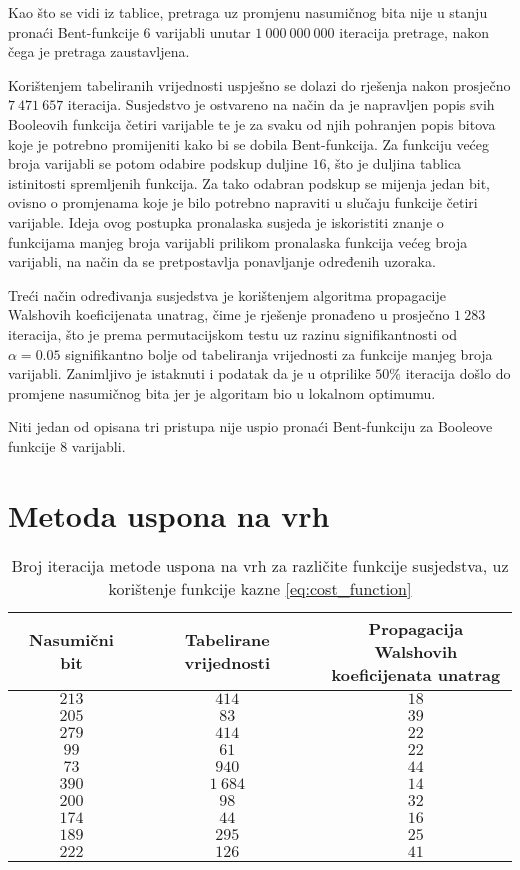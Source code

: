Kao što se vidi iz tablice, pretraga uz promjenu nasumičnog bita nije u stanju pronaći Bent-funkcije $6$ varijabli unutar $1\:000\:000\:000$ iteracija pretrage, nakon čega je pretraga zaustavljena.

Korištenjem tabeliranih vrijednosti uspješno se dolazi do rješenja nakon prosječno $7\:471\:657$ iteracija.
Susjedstvo je ostvareno na način da je napravljen popis svih Booleovih funkcija četiri varijable te je za svaku od njih pohranjen popis bitova koje je potrebno promijeniti kako bi se dobila Bent-funkcija.
Za funkciju većeg broja varijabli se potom odabire podskup duljine $16$, što je duljina tablica istinitosti spremljenih funkcija.
Za tako odabran podskup se mijenja jedan bit, ovisno o promjenama koje je bilo potrebno napraviti u slučaju funkcije četiri varijable.
Ideja ovog postupka pronalaska susjeda je iskoristiti znanje o funkcijama manjeg broja varijabli prilikom pronalaska funkcija većeg broja varijabli, na način da se pretpostavlja ponavljanje određenih uzoraka.

Treći način određivanja susjedstva je korištenjem algoritma propagacije Walshovih koeficijenata unatrag, čime je rješenje pronađeno u prosječno $1\:283$ iteracija, što je prema permutacijskom testu uz razinu signifikantnosti od $\alpha = 0.05$ signifikantno bolje od tabeliranja vrijednosti za funkcije manjeg broja varijabli.
Zanimljivo je istaknuti i podatak da je u otprilike $50\%$ iteracija došlo do promjene nasumičnog bita jer je algoritam bio u lokalnom optimumu.

Niti jedan od opisana tri pristupa nije uspio pronaći Bent-funkciju za Booleove funkcije $8$ varijabli.

\section{Metoda uspona na vrh}
\begin{table}[]
    \centering
    \begin{tabular}{ccc}
        Nasumični bit & Tabelirane vrijednosti & \makecell{Propagacija Walshovih \\ koeficijenata unatrag} \\ \hline
        $213$ &    $414$ & $18$ \\
        $205$ &     $83$ & $39$ \\
        $279$ &    $414$ & $22$ \\
         $99$ &     $61$ & $22$ \\
         $73$ &    $940$ & $44$ \\
        $390$ & $1\:684$ & $14$ \\
        $200$ &     $98$ & $32$ \\
        $174$ &     $44$ & $16$ \\
        $189$ &    $295$ & $25$ \\
        $222$ &    $126$ & $41$
    \end{tabular}
    \captionsetup{justification=centering}
    \caption{Broj iteracija metode uspona na vrh za različite funkcije susjedstva, uz korištenje funkcije kazne \eqref{eq:cost_function}}
    \label{tbl:greedy_6}
\end{table}

